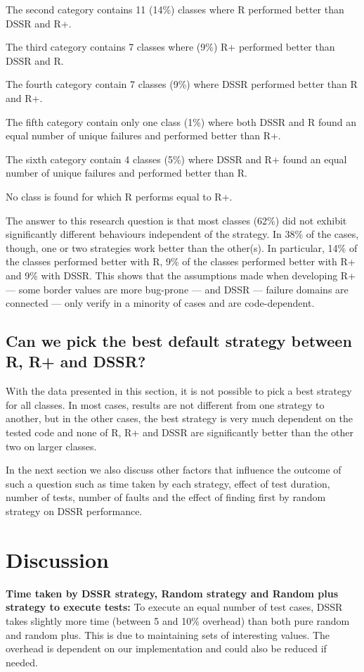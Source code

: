 \documentclass{acm_proc_article-sp}
\begin{document}
The second category contains 11 (14\%) classes where R performed better than DSSR and R+. 

The third category contains 7 classes where (9\%) R+ performed better than DSSR and R. 

 The fourth category contain 7 classes (9\%) where DSSR performed better than R and R+. 

The fifth category contain only one class (1\%) where both DSSR and R found an equal number of unique failures and performed better than R+. 

The sixth category contain 4 classes (5\%) where DSSR and R+ found an equal number of unique failures and performed better than R. 

No class is found for which R performs equal to R+.

The answer to this research question is that most classes (62\%) did not exhibit significantly different behaviours independent of the strategy. In 38\% of the cases, though, one or two strategies work better than the other(s). In particular, 14\% of the classes performed better with R, 9\% of the classes performed better with R+ and 9\% with DSSR. This shows that the assumptions made when developing R+ --- some border values are more bug-prone --- and DSSR --- failure domains are connected --- only verify in a minority of cases and are code-dependent.



\subsection{Can we pick the best default strategy between R, R+ and DSSR?}
With the data presented in this section, it is not possible to pick a best strategy for all classes. In most cases, results are not different from one strategy to another, but in the other cases, the best strategy is very much dependent on the tested code and none of R, R+ and DSSR are significantly better than the other two on larger classes. 

In the next section we also discuss other factors that influence the outcome of such a question such as time taken by each strategy, effect of test duration, number of tests, number of faults and the effect of finding first by random strategy on DSSR performance.




\section{Discussion}\label{sec:discussion}
\textbf{Time taken by DSSR strategy, Random strategy and Random plus strategy to execute tests:}
To execute an equal number of test cases, DSSR takes slightly more time (between 5 and 10\% overhead) than both pure random and random plus. This is due to maintaining sets of interesting values. The overhead is dependent on our implementation and could also be reduced if needed. 
\end{document}
